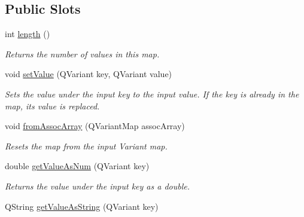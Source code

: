 \subsection*{Public Slots}
\begin{DoxyCompactItemize}
\item 
\hypertarget{class_picto_1_1_variable_map_a073b5f475010e7cf3dada48e206220fc}{int \hyperlink{class_picto_1_1_variable_map_a073b5f475010e7cf3dada48e206220fc}{length} ()}\label{class_picto_1_1_variable_map_a073b5f475010e7cf3dada48e206220fc}

\begin{DoxyCompactList}\small\item\em Returns the number of values in this map. \end{DoxyCompactList}\item 
\hypertarget{class_picto_1_1_variable_map_a1c2bb196fce684d37622708ed4906b61}{void \hyperlink{class_picto_1_1_variable_map_a1c2bb196fce684d37622708ed4906b61}{set\-Value} (Q\-Variant key, Q\-Variant value)}\label{class_picto_1_1_variable_map_a1c2bb196fce684d37622708ed4906b61}

\begin{DoxyCompactList}\small\item\em Sets the value under the input key to the input value. If the key is already in the map, its value is replaced. \end{DoxyCompactList}\item 
void \hyperlink{class_picto_1_1_variable_map_afba834998d686c7b287b171f5992f642}{from\-Assoc\-Array} (Q\-Variant\-Map assoc\-Array)
\begin{DoxyCompactList}\small\item\em Resets the map from the input Variant map. \end{DoxyCompactList}\item 
\hypertarget{class_picto_1_1_variable_map_a5348b609c797f5919068755db0b86338}{double \hyperlink{class_picto_1_1_variable_map_a5348b609c797f5919068755db0b86338}{get\-Value\-As\-Num} (Q\-Variant key)}\label{class_picto_1_1_variable_map_a5348b609c797f5919068755db0b86338}

\begin{DoxyCompactList}\small\item\em Returns the value under the input key as a double. \end{DoxyCompactList}\item 
\hypertarget{class_picto_1_1_variable_map_a87750afd17a6e9107da462c148ab6ed4}{Q\-String \hyperlink{class_picto_1_1_variable_map_a87750afd17a6e9107da462c148ab6ed4}{get\-Value\-As\-String} (Q\-Variant key)}\label{class_picto_1_1_variable_map_a87750afd17a6e9107da462c148ab6ed4}


\end{DoxyCompactItemize}
